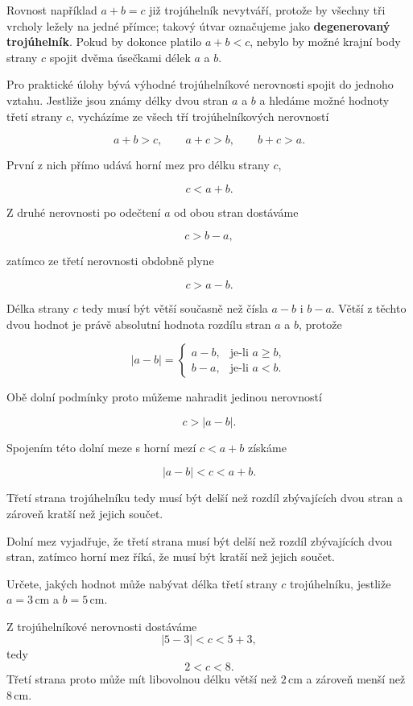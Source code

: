 \documentclass[12pt,a4paper]{article}
\begin{document}
Rovnost například $a+b=c$ již trojúhelník nevytváří, protože by všechny tři vrcholy ležely na jedné přímce;
takový útvar označujeme jako \textbf{degenerovaný trojúhelník}. Pokud by dokonce platilo $a+b<c$, nebylo by možné
krajní body strany $c$ spojit dvěma úsečkami délek $a$ a $b$.

Pro praktické úlohy bývá výhodné trojúhelníkové nerovnosti spojit do jednoho vztahu.
Jestliže jsou známy délky dvou stran $a$ a $b$ a hledáme možné hodnoty třetí strany $c$,
vycházíme ze všech tří trojúhelníkových nerovností

\[
    a+b>c,
    \qquad
    a+c>b,
    \qquad
    b+c>a.
\]

První z nich přímo udává horní mez pro délku strany $c$,

\[
    c<a+b.
\]

Z druhé nerovnosti po odečtení $a$ od obou stran dostáváme

\[
    c>b-a,
\]

zatímco ze třetí nerovnosti obdobně plyne

\[
    c>a-b.
\]

Délka strany $c$ tedy musí být větší současně než čísla $a-b$ i $b-a$.
Větší z těchto dvou hodnot je právě absolutní hodnota rozdílu stran $a$ a $b$, protože

\[
    |a-b|
    =
    \begin{cases}
        a-b, & \text{je-li } a\geq b,\\
        b-a, & \text{je-li } a<b.
    \end{cases}
\]

Obě dolní podmínky proto můžeme nahradit jedinou nerovností

\[
    c>|a-b|.
\]

Spojením této dolní meze s horní mezí $c<a+b$ získáme

\[
    |a-b|<c<a+b.
\]

Třetí strana trojúhelníku tedy musí být delší než rozdíl zbývajících dvou stran
a zároveň kratší než jejich součet.

Dolní mez vyjadřuje, že třetí strana musí být delší než rozdíl zbývajících dvou stran, zatímco horní mez říká,
že musí být kratší než jejich součet.

\begin{examplebox}
    Určete, jakých hodnot může nabývat délka třetí strany $c$ trojúhelníku, jestliže $a=3\,\mathrm{cm}$ a $b=5\,\mathrm{cm}$.

    Z trojúhelníkové nerovnosti dostáváme
    \[
        |5-3|<c<5+3,
    \]
    tedy
    \[
        2<c<8.
    \]
    Třetí strana proto může mít libovolnou délku větší než $2\,\mathrm{cm}$ a zároveň menší než $8\,\mathrm{cm}$.
\end{examplebox}
\end{document}
